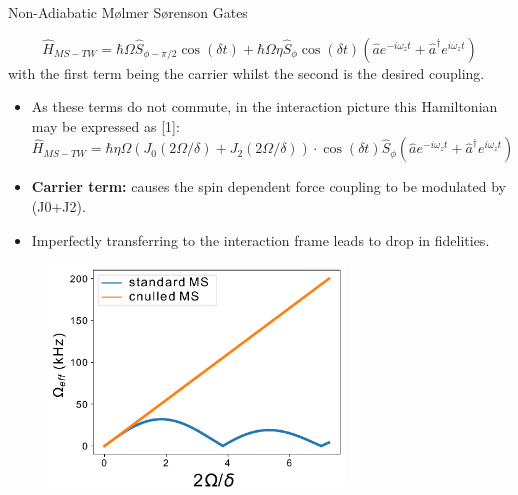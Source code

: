 \documentclass[final]{beamer}
\begin{document}
\begin{frame}{}
\begin{center}
\begin{columns}[t]
\begin{column}{0.49\textwidth}
\begin{alertblock}{Non-Adiabatic Mølmer Sørenson Gates}
\begin{minipage}{0.14\linewidth}
\begin{figure}
      \end{figure}
      \end{minipage}
      \Large$$ \hat{H}_{MS-TW} = \hbar\Omega \hat{S}_{\phi-\pi/2}\cos{(\delta t)} + \hbar\Omega\eta \hat{S}_\phi\cos{(\delta t)}(\hat{a}e^{-i\omega_zt} + \hat{a}^\dagger e^{i\omega_zt})$$\normalsize
      \vspace*{0.8em} with the first term being the carrier whilst the second is the desired coupling.
      \vspace*{-1.4em}
      \begin{itemize}
      \item As these terms do not commute, in the interaction picture this Hamiltonian
            may be expressed as [1]:
      \Large$$ \hat{H}_{MS-TW} = \hbar\eta\Omega(J_0(2\Omega/\delta) + J_2(2\Omega/\delta))\cdot \cos{(\delta t)}\hat{S}_{\phi}(\hat{a}e^{-i\omega_zt} + \hat{a}^\dagger e^{i\omega_zt})$$\normalsize
      \end{itemize}
      \begin{minipage}{0.58\textwidth}
      \vspace*{-5em}
      \begin{itemize}
      \item \textbf{Carrier term:} causes the spin dependent force
        coupling to be modulated by (J0+J2).
      \item Imperfectly transferring to the interaction frame leads to drop in fidelities.
      \end{itemize}

      \end{minipage}
      \begin{minipage}{0.38\textwidth}
      \begin{figure}
        \includegraphics[width=0.7\textwidth]{./figs/J0J2theory.pdf}
      \end{figure}
      \end{minipage}



\end{alertblock}
\end{column}
\end{columns}
\end{center}
\end{frame}
\end{document}
